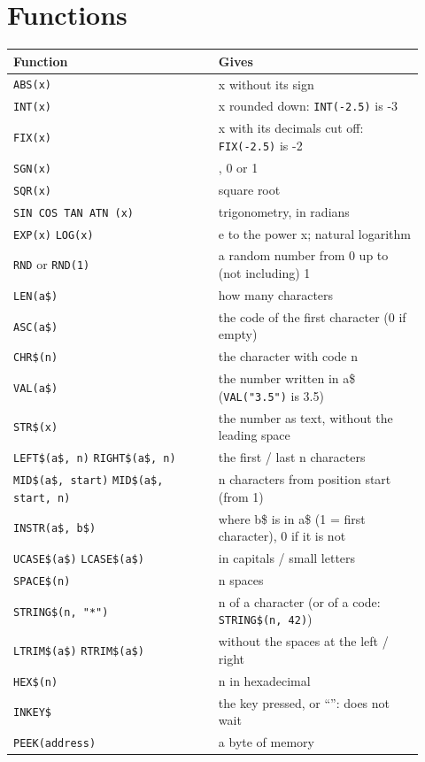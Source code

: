 \section{Functions}

\begin{center}
\small
\begin{tabular}{@{}>{\raggedright\arraybackslash}p{0.46\linewidth} >{\raggedright\arraybackslash}p{0.46\linewidth}@{}}
\toprule
\textbf{Function} & \textbf{Gives} \\
\midrule
\verb|ABS(x)| & x without its sign \\
\verb|INT(x)| & x rounded down: \verb|INT(-2.5)| is -3 \\
\verb|FIX(x)| & x with its decimals cut off: \verb|FIX(-2.5)| is -2 \\
\verb|SGN(x)| & -1, 0 or 1 \\
\verb|SQR(x)| & square root \\
\texttt{SIN COS TAN ATN (x)} & trigonometry, in radians \\
\verb|EXP(x)| \verb|LOG(x)| & e to the power x; natural logarithm \\
\verb|RND| or \verb|RND(1)| & a random number from 0 up to (not including) 1 \\
\verb|LEN(a$)| & how many characters \\
\verb|ASC(a$)| & the code of the first character (0 if empty) \\
\verb|CHR$(n)| & the character with code n \\
\verb|VAL(a$)| & the number written in a\$ (\verb|VAL("3.5")| is 3.5) \\
\verb|STR$(x)| & the number as text, without the leading space \\
\texttt{LEFT\$(a\$, n)} \texttt{RIGHT\$(a\$, n)} & the first / last n characters \\
\texttt{MID\$(a\$, start)} \texttt{MID\$(a\$, start, n)} & n characters from position start (from 1) \\
\texttt{INSTR(a\$, b\$)} & where b\$ is in a\$ (1 = first character), 0 if it is not \\
\verb|UCASE$(a$)| \verb|LCASE$(a$)| & in capitals / small letters \\
\verb|SPACE$(n)| & n spaces \\
\texttt{STRING\$(n, "*")} & n of a character (or of a code: \texttt{STRING\$(n, 42)}) \\
\verb|LTRIM$(a$)| \verb|RTRIM$(a$)| & without the spaces at the left / right \\
\verb|HEX$(n)| & n in hexadecimal \\
\verb|INKEY$| & the key pressed, or ``'': does not wait \\
\verb|PEEK(address)| & a byte of memory \\
\bottomrule
\end{tabular}
\end{center}

